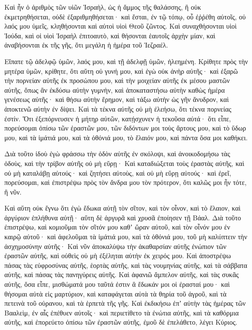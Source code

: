 {Καὶ ἦν ὁ ἀριθμὸς τῶν υἱῶν Ἰσραὴλ, ὡς ἡ ἄμμος τῆς θαλάσσης, ἣ οὐκ ἐκμετρηθήσεται, οὐδὲ ἐξαριθμηθήσεται· καὶ ἔσται, ἐν τῷ τόπῳ, οὗ ἐῤῥέθη αὐτοῖς, οὐ λαός μου ὑμεῖς, κληθήσονται καὶ αὐτοὶ υἱοὶ Θεοῦ ζῶντος.
Καὶ συναχθήσονται υἱοὶ Ἰούδα, καὶ οἱ υἱοὶ Ἰσραὴλ ἐπιτοαυτὸ, καὶ θήσονται ἑαυτοῖς ἀρχὴν μίαν, καὶ ἀναβήσονται ἐκ τῆς γῆς, ὅτι μεγάλη ἡ ἡμέρα τοῦ Ἰεζραέλ.
\par }{\PP {}Εἴπατε τῷ ἀδελφῷ ὑμῶν, λαός μου, καὶ τῇ ἀδελφῇ ὑμῶν, ἠλεημένη.
Κρίθητε πρὸς τὴν μητέρα ὑμῶν, κρίθητε, ὅτι αὕτη οὐ γυνή μου, καὶ ἐγὼ οὐκ ἀνὴρ αὐτῆς· καὶ ἐξαρῶ τὴν πορνείαν αὐτῆς ἐκ προσώπου μου, καὶ τὴν μοιχείαν αὐτῆς ἐκ μέσου μαστῶν αὐτῆς,
ὅπως ἂν ἐκδύσω αὐτὴν γυμνὴν, καὶ ἀποκαταστήσω αὐτὴν καθὼς ἡμέρα γενέσεως αὐτῆς· καὶ θήσω αὐτὴν ἔρημον, καὶ τάξω αὐτὴν ὡς γῆν ἄνυδρον, καὶ ἀποκτενῶ αὐτὴν ἐν δίψει.
Καὶ τὰ τέκνα αὐτῆς οὐ μὴ ἐλεήσω, ὅτι τέκνα πορνείας ἐστίν.
Ὅτι ἐξεπόρνευσεν ἡ μήτηρ αὐτῶν, κατῄσχυνεν ἡ τεκοῦσα αὐτά· ὅτι εἶπε, πορεύσομαι ὀπίσω τῶν ἐραστῶν μου, τῶν διδόντων μοι τοὺς ἄρτους μου, καὶ τὸ ὕδωρ μου, καὶ τὰ ἱμάτιά μου, καὶ τὰ ὀθόνιά μου, τὸ ἔλαιόν μου, καὶ πάντα ὅσα μοι καθήκει.
\par }{\PP {}Διὰ τοῦτο ἰδοὺ ἐγὼ φράσσω τὴν ὁδὸν αὐτῆς ἐν σκόλοψι, καὶ ἀνοικοδομήσω τὰς ὁδοὺς, καὶ τὴν τρίβον αὐτῆς οὐ μὴ εὕρῃ·
Καὶ καταδιώξεται τοὺς ἐραστὰς αὐτῆς, καὶ οὐ μὴ καταλάβῃ αὐτούς· καὶ ζητήσει αὐτοὺς, καὶ οὐ μὴ εὕρῃ αὐτούς· καὶ ἐρεῖ, πορεύσομαι, καὶ ἐπιστρέψω πρὸς τὸν ἄνδρα μου τὸν πρότερον, ὅτι καλῶς μοι ἦν τότε, ἢ νῦν.
\par }{\PP {}Καὶ αὕτη οὐκ ἔγνω ὅτι ἐγὼ ἔδωκα αὐτῇ τὸν σῖτον, καὶ τὸν οἶνον, καὶ τὸ ἔλαιον, καὶ ἀργύριον ἐπλήθυνα αὐτῇ· αὕτη δὲ ἀργυρᾶ καὶ χρυσᾶ ἐποίησεν τῇ Βάαλ.
Διὰ τοῦτο ἐπιστρέψω, καὶ κομιοῦμαι τὸν σῖτόν μου καθʼ ὥραν αὐτοῦ, καὶ τὸν οἶνόν μου ἐν καιρῷ αὐτοῦ· καὶ ἀφελοῦμαι τὰ ἱμάτιά μου, καὶ τὰ ὀθόνιά μου, τοῦ μὴ καλύπτειν τὴν ἀσχημοσύνην αὐτῆς·
Καὶ νῦν ἀποκαλύψω τὴν ἀκαθαρσίαν αὐτῆς ἐνώπιον τῶν ἐραστῶν αὐτῆς, καὶ οὐθεὶς οὐ μὴ ἐξέληται αὐτὴν ἐκ χειρός μου.
Καὶ ἀποστρέψω πάσας τὰς εὐφροσύνας αὐτῆς, ἑορτὰς αὐτῆς, καὶ τὰς νουμηνίας αὐτῆς, καὶ τὰ σάββατα αὐτῆς, καὶ πάσας τὰς πανηγύρεις αὐτῆς.
Καὶ ἀφανιῶ ἄμπελον αὐτῆς, καὶ τὰς συκᾶς αὐτῆς, ὅσα εἶπε, μισθώματά μου ταῦτά ἐστιν ἃ ἔδωκάν μοι οἱ ἐρασταί μου· καὶ θήσομαι αὐτὰ εἰς μαρτύριον, καὶ καταφάγεται αὐτὰ τὰ θηρία τοῦ ἀγροῦ, καὶ τὰ πετεινὰ τοῦ οὐρανου, καὶ τὰ ἑρπετὰ τῆς γῆς.
Καὶ ἐκδικήσω ἐπʼ αὐτὴν τὰς ἡμέρας τῶν Βααλεὶμ, ἐν αἷς ἐπέθυεν αὐτοῖς· καὶ περιετίθετο τὰ ἐνώτια αὐτῆς, καὶ τὰ καθόρμια αὐτῆς, καὶ ἐπορεύετο ὀπίσω τῶν ἐραστῶν αὐτῆς, ἐμοῦ δὲ ἐπελάθετο, λέγει Κύριος.
}
